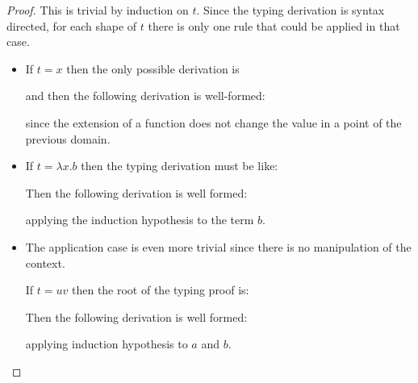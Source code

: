 \begin{proof}
  This is trivial by induction on $t$. Since the typing derivation
  is syntax directed, for each shape of $t$ there is only one rule
  that could be applied in that case.
  \begin{itemize}
  \item
    If $t = x$ then the only possible derivation is
    \begin{prooftree}
    \end{prooftree}

    and then the following derivation is well-formed:
    
    \begin{prooftree}
    \end{prooftree}

    since the extension of a function does not change the value in
    a point of the previous domain.
    
  \item
    If $t = \lambda x.b$ then the typing derivation must be like:
    
    \begin{prooftree}
    \end{prooftree}

    Then the following derivation is well formed:
    \begin{prooftree}
    \end{prooftree}

    applying the induction
    hypothesis to the term $b$.
  \item
    The application case is even more
    trivial since there is no manipulation of the context.
    
    If $t = u v$ then the root of the typing proof is:

    \begin{prooftree}
    \end{prooftree}

    Then the following derivation is well formed: 
    
    
    \begin{prooftree}
    \end{prooftree}

    applying induction hypothesis to $a$ and $b$.
  \end{itemize}
\end{proof}




